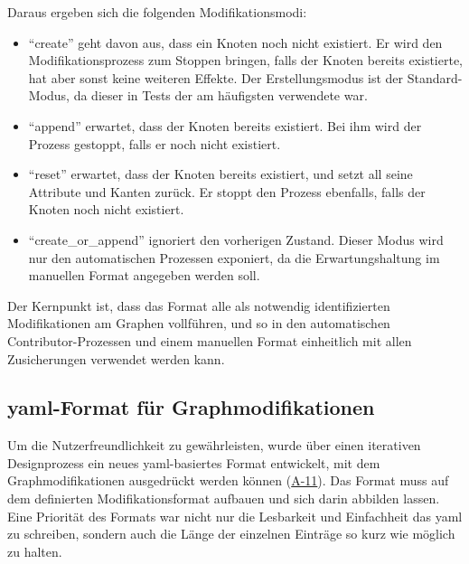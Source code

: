 Daraus ergeben sich die folgenden Modifikationsmodi:

\begin{itemize}
    \itemsep0em
    \item \enquote{create} geht davon aus, dass ein Knoten noch nicht existiert.
    Er wird den Modifikationsprozess zum Stoppen bringen, falls der Knoten bereits existierte, hat aber sonst keine weiteren Effekte.
    Der Erstellungsmodus ist der Standard-Modus, da dieser in Tests der am häufigsten verwendete war.
    \item \enquote{append} erwartet, dass der Knoten bereits existiert.
    Bei ihm wird der Prozess gestoppt, falls er noch nicht existiert.
    \item \enquote{reset} erwartet, dass der Knoten bereits existiert, und setzt all seine Attribute und Kanten zurück.
    Er stoppt den Prozess ebenfalls, falls der Knoten noch nicht existiert.
    \item \enquote{create\_or\_append} ignoriert den vorherigen Zustand.
    Dieser Modus wird nur den automatischen Prozessen exponiert, da die Erwartungshaltung im manuellen Format angegeben werden soll.
\end{itemize}

Der Kernpunkt ist, dass das Format alle als notwendig identifizierten Modifikationen am Graphen vollführen, und so in den automatischen Contributor-Prozessen und einem manuellen Format einheitlich mit allen Zusicherungen verwendet werden kann.

\subsection{\acrshort{yaml}-Format für Graphmodifikationen}\label{subsec:modell-graph-modification-yaml}

Um die Nutzerfreundlichkeit zu gewährleisten, wurde über einen iterativen Designprozess ein neues \acrshort{yaml}-basiertes Format entwickelt, mit dem Graphmodifikationen ausgedrückt werden können (\hyperref[subsec:req-manual-format-modification-for-real]{A-11}).
Das Format muss auf dem definierten Modifikationsformat aufbauen und sich darin abbilden lassen.
Eine Priorität des Formats war nicht nur die Lesbarkeit und Einfachheit das \acrshort{yaml} zu schreiben, sondern auch die Länge der einzelnen Einträge so kurz wie möglich zu halten.

